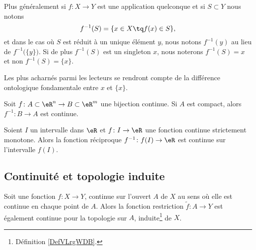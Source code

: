 Plus généralement si \( f\colon X\to Y\) est une application quelconque et si \( S\subset Y\) nous notons
\begin{equation}
	f^{-1}(S)=\{ x\in X\tq f(x)\in S \},
\end{equation}
et dans le cas où \( S\) est réduit à un unique élément \( y\), nous notons \( f^{-1}(y)\) au lieu de \( f^{-1}\big( \{ y \} \big)\). Si de plus \( f^{-1}(S)\) est un singleton \( x\), nous noterons \( f^{-1}(S)=x\) et non \( f^{-1}(S)=\{ x \}\).

Les plus acharnés parmi les lecteurs se rendront compte de la différence ontologique fondamentale entre \( x\) et \( \{ x \}\).

\begin{proposition}	\label{PropoInvCompCont}
	Soit \( f\colon A\subset\eR^n\to B\subset\eR^m\) une bijection continue. Si \( A\) est compact, alors \( f^{-1}\colon B\to A\) est continue.
\end{proposition}

\begin{proposition}		\label{PropIntContMOnIvCont}
	Soient \( I\) un intervalle dans \( \eR\) et \( f\colon I\to \eR\) une fonction continue strictement monotone. Alors la fonction réciproque \( f^{-1}\colon f(I)\to \eR\) est continue sur l'intervalle \( f(I)\).
\end{proposition}

\subsection{Continuité et topologie induite}
\begin{proposition}     \label{PROPooNPLBooPfmmym}
	Soit une fonction \( f\colon X\to Y\), continue sur l'ouvert \( A\) de \( X\) au sens où elle est continue en chaque point de \( A\). Alors la fonction restriction \( \tilde f\colon A\to Y\) est également continue pour la topologie sur \( A\), induite\footnote{Définition \ref{DefVLrgWDB}.} de \( X\).
\end{proposition}

